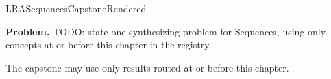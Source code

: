 \ifcsname LRASequencesCapstoneRendered\endcsname
\else
\expandafter\gdef\csname LRASequencesCapstoneRendered\endcsname{}

\newpage
{}
\label{cap:sequences}

\begin{tcolorbox}[
  colback=gray!6,
  colframe=gray!40,
  arc=2pt,
  left=8pt, right=8pt, top=6pt, bottom=6pt,
  title={\small\textbf{Capstone Problem}},
  fonttitle=\small\bfseries
]
\textbf{Problem.}
TODO: state one synthesizing problem for Sequences, using only concepts at or
before this chapter in the registry.
\end{tcolorbox}

\begin{remark*}
The capstone may use only results routed at or before this chapter.
\end{remark*}

\clearpage
\fi
